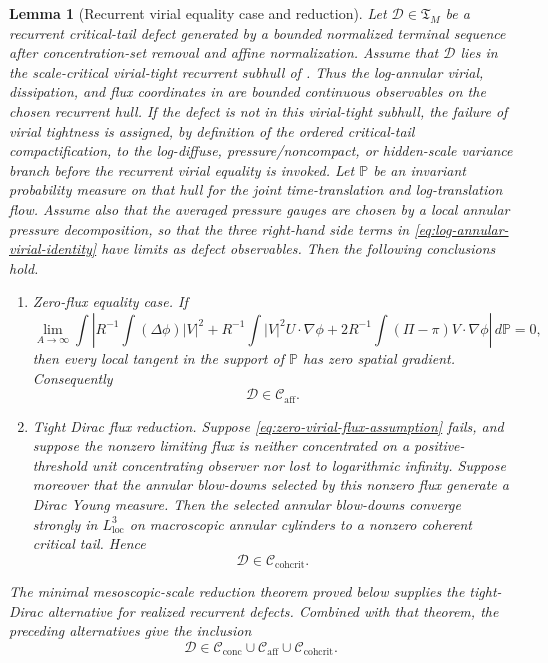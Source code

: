\documentclass[11pt]{amsart}
\numberwithin{equation}{section}
\theoremstyle{plain}
\newtheorem{lemma}[lemma]{Lemma}
\theoremstyle{definition}
\theoremstyle{remark}
\newcommand{\loc}{\mathrm{loc}}
\newcommand{\Cactive}{\mathcal C_{\mathrm{conc}}}
\newcommand{\Caff}{\mathcal C_{\mathrm{aff}}}
\newcommand{\Ccohcrit}{\mathcal C_{\mathrm{cohcrit}}}
\newcommand{\Tcrit}{\mathfrak T_M}
\begin{document}
\begin{lemma}[Recurrent virial equality case and reduction]
\label{lem:recurrent-virial-equality-reduction}
Let \(\mathcal D\in\Tcrit\) be a recurrent critical-tail defect generated by a
bounded normalized terminal sequence after concentration-set removal and affine
normalization.  Assume that \(\mathcal D\) lies in the scale-critical
virial-tight recurrent subhull of
.  Thus the log-annular virial,
dissipation, and flux coordinates in
 are bounded continuous observables on
the chosen recurrent hull.  If the defect is not in this virial-tight subhull,
the failure of virial tightness is assigned, by definition of the ordered
critical-tail compactification, to the log-diffuse, pressure/noncompact, or
hidden-scale variance branch before the recurrent virial equality is invoked.
Let \(\mathbb P\) be an
invariant probability measure on that hull for the joint time-translation and
log-translation flow.  Assume also that the averaged pressure gauges are chosen
by a local annular pressure decomposition, so that the three right-hand side
terms in \eqref{eq:log-annular-virial-identity} have limits as defect
observables.  Then the following conclusions hold.

\begin{enumerate}[label=\textup{(\roman*)}]
   \item \emph{Zero-flux equality case.}  If
   \begin{equation}
   \label{eq:zero-virial-flux-assumption}
      \lim_{A\to\infty}
      \int
      \left|
         R^{-1}\int (\Delta\phi)|V|^2
         +R^{-1}\int |V|^2U\cdot\nabla\phi
         +2R^{-1}\int(\Pi-\pi)V\cdot\nabla\phi
      \right|\,d\mathbb P=0,
   \end{equation}
   then every local tangent in the support of \(\mathbb P\) has zero spatial
   gradient.  Consequently
   \[
      \mathcal D\in\Caff .
   \]
   \item \emph{Tight Dirac flux reduction.}  Suppose
   \eqref{eq:zero-virial-flux-assumption} fails, and suppose the nonzero
   limiting flux is neither concentrated on a positive-threshold unit concentrating
   observer nor lost to logarithmic infinity.  Suppose moreover that the
   annular blow-downs selected by this nonzero flux generate a Dirac Young
   measure.  Then the selected annular blow-downs converge strongly in
   \(L^3_{\loc}\) on macroscopic annular cylinders to a nonzero coherent
   critical tail.  Hence
   \[
      \mathcal D\in\Ccohcrit .
   \]
\end{enumerate}
The minimal mesoscopic-scale reduction theorem proved below supplies the tight-Dirac
alternative for realized recurrent defects.  Combined with that theorem, the
preceding alternatives give the inclusion
\[
   \mathcal D\in\Cactive\cup\Caff\cup\Ccohcrit .
\]
\end{lemma}
\end{document}
